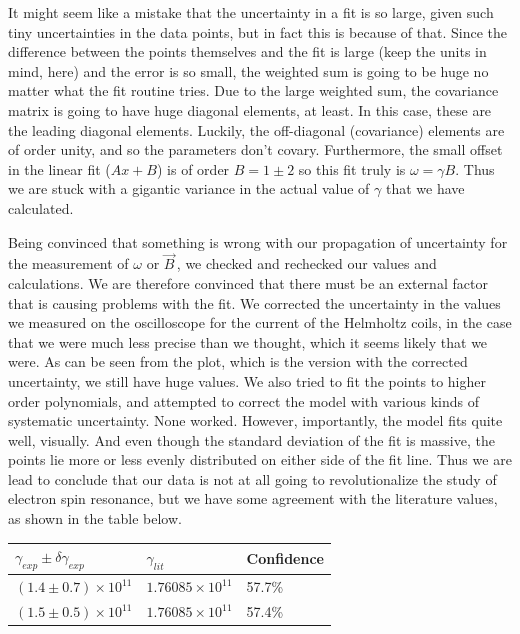 \documentclass{article}
\newcommand{\B}{$\vec{B}\,$}
\begin{document}
	It might seem like a mistake that the uncertainty in a fit is so large, given such tiny uncertainties in the data points, but in fact this is because of that.  Since the difference between the points themselves and the fit is large (keep the units in mind, here) and the error is so small, the weighted sum is going to be huge no matter what the fit routine tries.  Due to the large weighted sum, the covariance matrix is going to have huge diagonal elements, at least.  In this case, these are the leading diagonal elements.  Luckily, the off-diagonal (covariance) elements are of order unity, and so the parameters don't covary.  Furthermore, the small offset in the linear fit ($Ax + B$) is of order $B = 1\pm 2$ so this fit truly is $\omega = \gamma B$.  Thus we are stuck with a gigantic variance in the actual value of $\gamma$ that we have calculated.

	\vspace{.25cm}

	Being convinced that something is wrong with our propagation of uncertainty for the measurement of $\omega$ or \B, we checked and rechecked our values and calculations.  We are therefore convinced that there must be an external factor that is causing problems with the fit.  We corrected the uncertainty in the values we measured on the oscilloscope for the current of the Helmholtz coils, in the case that we were much less precise than we thought, which it seems likely that we were.  As can be seen from the plot, which is the version with the corrected uncertainty, we still have huge values.  We also tried to fit the points to higher order polynomials, and attempted to correct the model with various kinds of systematic uncertainty.  None worked.  However, importantly, the model fits quite well, visually.  And even though the standard deviation of the fit is massive, the points lie more or less evenly distributed on either side of the fit line.  Thus we are lead to conclude that our data is not at all going to revolutionalize the study of electron spin resonance, but we have some agreement with the literature values, as shown in the table below.

	\begin{center}
	\begin{tabular}{|l|l|l|}
		\hline
		$\gamma_{exp} \pm \delta\gamma_{exp}$ & $\gamma_{lit}$ & Confidence \\
		\hline
		$(1.4 \pm 0.7) \times 10^{11}$ & $1.76085 \times 10^{11}$ & 57.7\% \\
		$(1.5 \pm 0.5) \times 10^{11}$ & $1.76085 \times 10^{11}$ & 57.4\% \\
		\hline
	\end{tabular}
	\end{center}
\end{document}
